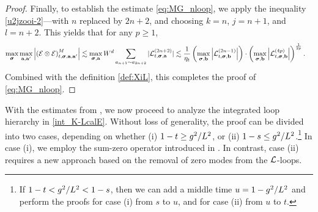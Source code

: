 \begin{proof}
Finally, to establish the estimate \eqref{eq:MG_nloop}, we apply the inequality \eqref{u2jzooi-2}---with $n$ replaced by $2n+2$, and choosing $k=n$, $j=n+1$, and $l=n+2$. This yields that for any $p\ge 1$,
\begin{align*}
\max_{{\boldsymbol{\sigma}}}\max_{{\mathbf{a}},{\mathbf{a}}'}\left|{\left( \mathcal E\otimes  \mathcal E \right)^{M}_{t, {\boldsymbol{\sigma}}, {\mathbf{a}},{\mathbf{a}}'}}\right|&\lesssim \max_{{\boldsymbol{\sigma}},{\mathbf{a}}} W^d \sum_{a_{n+1}\sim a_{2n+2}}  |{\mathcal L}^{(2n+2)}_{t, {\boldsymbol{\sigma}}, {\mathbf{a}}}|  \lesssim \frac{1}{\eta_t} \left({\max_{{\boldsymbol{\sigma}},{\mathbf{b}}}  \left|{\mathcal L}^{(2n-1)}_{t, {\boldsymbol{\sigma}}, {\mathbf{b}} }\right|}\right) \cdot  \left(\max_{{\boldsymbol{\sigma}},{\mathbf{b}}} \left|  {\mathcal L}^{(4p)}_{t, {\boldsymbol{\sigma}}, {\mathbf{b}}}\right|\right)^{\frac{1}{2p}}. 
\end{align*}
Combined with the definition \eqref{def:XiL}, this completes the proof of \eqref{eq:MG_nloop}.
\end{proof}

With the estimates from , we now proceed to analyze the integrated loop hierarchy in \eqref{int_K-LcalE}. 
Without loss of generality, the proof can be divided into two cases, depending on whether (i) $1-t \ge g^2/L^{2}$, or (ii) $1-s \le g^2/L^{2}$.\footnote{If $1-t < g^2/L^{2} < 1-s$, then we can add a middle time $u=1-g^2/L^{2}$ and perform the proofs for case (i) from $s$ to $u$, and for case (ii) from $u$ to $t$.} 
In case (i), we employ the sum-zero operator introduced in \cite{YY_25}. In contrast, case (ii) requires a new approach based on the removal of zero modes from the $\mathcal L$-loops.

